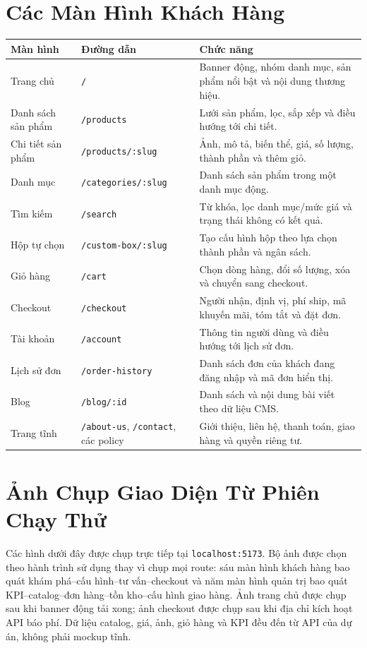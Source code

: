 \section{Các Màn Hình Khách Hàng}

\begin{longtable}{@{}L{0.25\textwidth} L{0.24\textwidth} L{0.43\textwidth}@{}}
  \toprule
  \textbf{Màn hình} & \textbf{Đường dẫn} & \textbf{Chức năng} \\
  \midrule
  \endhead
  Trang chủ & \texttt{/} & Banner động, nhóm danh mục, sản phẩm nổi bật và nội dung thương hiệu. \\
  Danh sách sản phẩm & \texttt{/products} & Lưới sản phẩm, lọc, sắp xếp và điều hướng tới chi tiết. \\
  Chi tiết sản phẩm & \texttt{/products/:slug} & Ảnh, mô tả, biến thể, giá, số lượng, thành phần và thêm giỏ. \\
  Danh mục & \texttt{/categories/:slug} & Danh sách sản phẩm trong một danh mục động. \\
  Tìm kiếm & \texttt{/search} & Từ khóa, lọc danh mục/mức giá và trạng thái không có kết quả. \\
  Hộp tự chọn & \texttt{/custom-box/:slug} & Tạo cấu hình hộp theo lựa chọn thành phần và ngân sách. \\
  Giỏ hàng & \texttt{/cart} & Chọn dòng hàng, đổi số lượng, xóa và chuyển sang checkout. \\
  Checkout & \texttt{/checkout} & Người nhận, định vị, phí ship, mã khuyến mãi, tóm tắt và đặt đơn. \\
  Tài khoản & \texttt{/account} & Thông tin người dùng và điều hướng tới lịch sử đơn. \\
  Lịch sử đơn & \texttt{/order-history} & Danh sách đơn của khách đang đăng nhập và mã đơn hiển thị. \\
  Blog & \texttt{/blog/:id} & Danh sách và nội dung bài viết theo dữ liệu CMS. \\
  Trang tĩnh & \texttt{/about-us}, \texttt{/contact}, các policy & Giới thiệu, liên hệ, thanh toán, giao hàng và quyền riêng tư. \\
  \bottomrule
\end{longtable}

\section{Ảnh Chụp Giao Diện Từ Phiên Chạy Thử}

Các hình dưới đây được chụp trực tiếp tại \texttt{localhost:5173}. Bộ ảnh được chọn theo hành trình sử dụng thay vì chụp mọi route: sáu màn hình khách hàng bao quát khám phá--cấu hình--tư vấn--checkout và năm màn hình quản trị bao quát KPI--catalog--đơn hàng--tồn kho--cấu hình giao hàng. Ảnh trang chủ được chụp sau khi banner động tải xong; ảnh checkout được chụp sau khi địa chỉ kích hoạt API báo phí. Dữ liệu catalog, giá, ảnh, giỏ hàng và KPI đều đến từ API của dự án, không phải mockup tĩnh.

